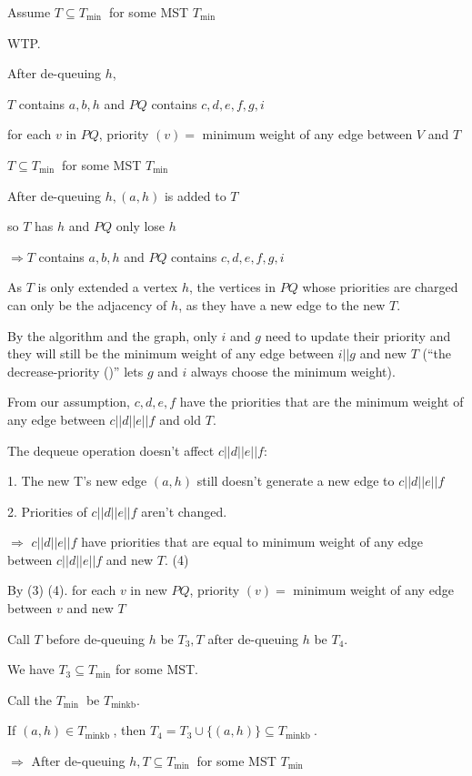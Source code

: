 \documentclass[12pt]{article}
\begin{document}
Assume $T \subseteq T_{\text {min }}$ for some MST $T_{\text {min }}$

WTP.

After de-queuing $h$,

$T$ contains $a, b, h$ and $P Q$ contains $c, d, e, f, g, i$

for each $v$ in $P Q$, priority $(v)=$ minimum weight of any edge between $V$ and $T$ 

$T \subseteq T_{\text {min }}$ for some MST $T_{\text {min }}$

After de-queuing $h,(a, h)$ is added to $T$

so $T$ has $h$ and $P Q$ only lose $h$

$\Rightarrow T$ contains $a, b, h$ and $P Q$ contains $c, d, e, f, g, i$

As $T$ is only extended a vertex $h$, the vertices in $P Q$ whose priorities are charged can only be the adjacency of $h$, as they have a new edge to the new $T$.

By the algorithm and the graph, only $i$ and $g$ need to update their priority and they will still be the minimum weight of any edge between $i || g$ and new $T$ (``the decrease-priority ()'' lets $g$ and $i$ always choose the minimum weight).

From our assumption, $c, d, e, f$ have the priorities that are the minimum weight of any edge between $c||d||e||f$ and old $T$.

The dequeue operation doesn't affect $c||d||e||f$:

1. The new T's new edge $(a, h)$ still doesn't generate a new edge to $c||d||e||f$

2. Priorities of $c||d||e||f$ aren't changed.

$\Rightarrow$ $c||d||e||f$ have priorities that are equal to minimum weight of any edge between $c||d||e||f$ and new $T$. (4)

By (3) (4). for each $v$ in new $P Q$, priority $(v)=$ minimum weight of any edge between $v$ and new $T$

Call $T$ before de-queuing $h$ be $T_3, T$ after de-queuing $h$ be $T_4$.

We have $T_3 \subseteq T_{\min }$ for some MST.

Call the $T_{\text {min }}$ be $T_{\text {minkb}}$.

If $(a, h) \in T_{\text {minkb }}$, then $T_4=T_3 \cup\{(a, h)\} \subseteq T_{\text {minkb }}$.

$\Rightarrow$ After de-queuing $h, T \subseteq T_{\text {min }}$ for some MST $T_{\text {min }}$ 
\end{document}
